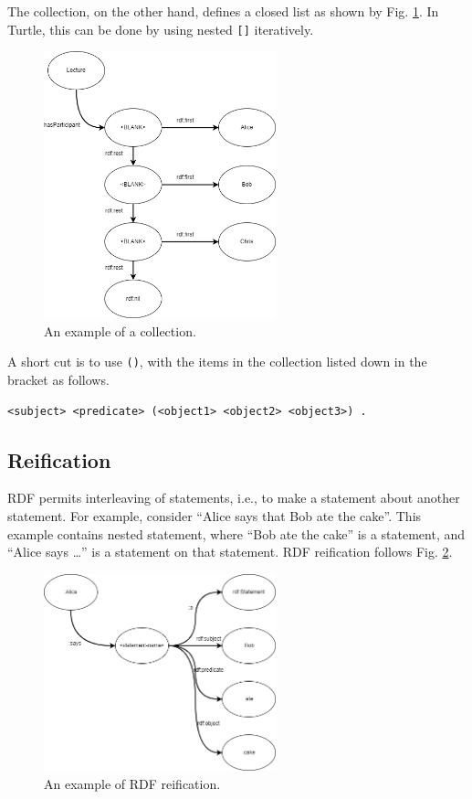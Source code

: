 The collection, on the other hand, defines a closed list as shown by Fig. \ref{fig:lectureexp4}. In Turtle, this can be done by using nested \verb|[]| iteratively.
\begin{figure}[htbp]
	\centering
	\includegraphics[width=0.6\textwidth]{./chapters/ch-semanticwebarchitecture/figures/lectureexp4.png}
	\caption{An example of a collection.}
	\label{fig:lectureexp4}
\end{figure}
A short cut is to use \verb|()|, with the items in the collection listed down in the bracket as follows.
\begin{lstlisting}
<subject> <predicate> (<object1> <object2> <object3>) .
\end{lstlisting}

\subsection{Reification}

RDF permits interleaving of statements, i.e., to make a statement about another statement. For example, consider ``Alice says that Bob ate the cake''. This example contains nested statement, where ``Bob ate the cake'' is a statement, and ``Alice says \ldots'' is a statement on that statement. RDF reification follows Fig. \ref{fig:reificationexp}.
\begin{figure}[htbp]
	\centering
	\includegraphics[width=0.6\textwidth]{./chapters/ch-semanticwebarchitecture/figures/reificationexp.png}
	\caption{An example of RDF reification.}
	\label{fig:reificationexp}
\end{figure}

